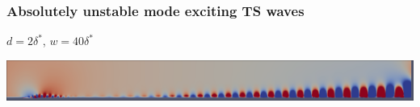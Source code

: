 \documentclass[
  aspectratio=169, %
  t, %
  onlytextwidth, %
  10pt, %
]{beamer}
\begin{document}
\begin{frame}
	\frametitle{Absolutely unstable mode exciting TS waves}
	$d=2\delta^*$, $w=40\delta^*$

	\centering
	\includegraphics[width=\linewidth]{Images/d2_w40.png}
  
\end{frame}
\end{document}
